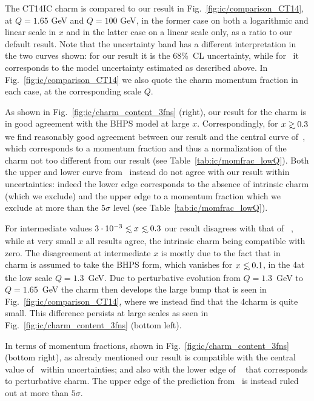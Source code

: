 The CT14IC charm \pdf is compared to our result in
Fig.~\ref{fig:ic/comparison_CT14}, at  $Q=1.65$ GeV and $Q=100$ GeV, in
the former case on both a logarithmic and linear scale in $x$ and in
the latter case on a linear scale only, as a ratio to our default
result.
%
Note that the uncertainty band has a different interpretation in the
two curves shown: for our result it is the 68\%~CL \pdf uncertainty,
while for~\cite{Hou:2017khm}  it corresponds to the model
uncertainty estimated as described above.
%
In Fig.~\ref{fig:ic/comparison_CT14} we also quote
the charm momentum fraction in each case, at the corresponding scale $Q$. 

As shown in Fig.~\ref{fig:ic/charm_content_3fns} (right), our result for
the charm \pdf is in good agreement with the BHPS model at large
$x$. Correspondingly, for $x\gsim 0.3$
we find reasonably good agreement between our
result and the central curve of~\cite{Hou:2017khm}, which
corresponds to a momentum fraction and thus a normalization of the charm
\pdf not too different from our result (see Table~\ref{tab:ic/momfrac_lowQ}).
%
Both the upper and lower curve from~\cite{Hou:2017khm} instead
do not agree with our result within uncertainties: indeed the
lower edge corresponds to the absence of intrinsic charm (which we
exclude) and the upper edge to a momentum fraction which we exclude
at more than the $5\sigma$ level (see Table~\ref{tab:ic/momfrac_lowQ}). 

For intermediate values $3\cdot10^{-3}\lsim x\lsim 0.3$  our result disagrees
with that of 
~\cite{Hou:2017khm}, while at very small $x$ all results agree,
the intrinsic charm being compatible with zero.
The disagreement at intermediate $x$ is mostly due
to the fact that in ~\cite{Hou:2017khm} charm is assumed to take
the BHPS form, which vanishes for $x\lsim 0.1$,
in the 4\fns at the low scale $Q=1.3$~GeV.
%
Due to perturbative evolution from  $Q=1.3$~GeV to $Q=1.65$~GeV the charm 
\pdf then develops the large bump that is
seen in Fig.~\ref{fig:ic/comparison_CT14}, where we instead find that 
the 4\fns charm \pdf is quite small.
%
This difference persists at large scales as seen  in
Fig.~\ref{fig:ic/charm_content_3fns} (bottom left).

In terms of momentum fractions, shown in Fig.~\ref{fig:ic/charm_content_3fns} (bottom right),
as already mentioned our result is
compatible with the central value of~\cite{Hou:2017khm} within
uncertainties; and also with the lower edge of ~\cite{Hou:2017khm}
that corresponds to perturbative charm.
%
The upper edge  of the prediction from~\cite{Hou:2017khm} is instead
ruled out at more than $5\sigma$. 

